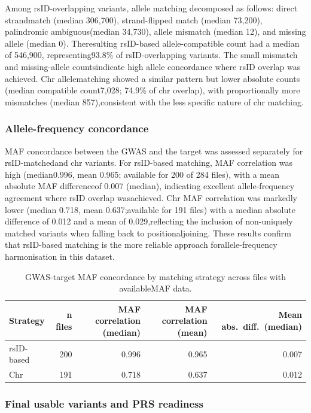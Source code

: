 \documentclass[11pt,a4paper]{article}
\begin{document}
Among rsID-overlapping variants, allele matching decomposed as follows: direct strandmatch (median 306,700), strand-flipped match (median 73,200), palindromic ambiguous(median 34,730), allele mismatch (median 12), and missing allele (median 0). Theresulting rsID-based allele-compatible count had a median of 546,900, representing93.8\% of rsID-overlapping variants. The small mismatch and missing-allele countsindicate high allele concordance where rsID overlap was achieved. Chr allelematching showed a similar pattern but lower absolute counts (median compatible count7,028; 74.9\% of chr overlap), with proportionally more mismatches (median 857),consistent with the less specific nature of chr matching.

\subsubsection*{Allele-frequency concordance}

MAF concordance between the GWAS and the target was assessed separately for rsID-matchedand chr variants. For rsID-based matching, MAF correlation was high (median0.996, mean 0.965; available for 200 of 284 files), with a mean absolute MAF differenceof 0.007 (median), indicating excellent allele-frequency agreement where rsID overlap wasachieved. Chr MAF correlation was markedly lower (median 0.718, mean 0.637;available for 191 files) with a median absolute difference of 0.012 and a mean of 0.029,reflecting the inclusion of non-uniquely matched variants when falling back to positionaljoining. These results confirm that rsID-based matching is the more reliable approach forallele-frequency harmonisation in this dataset.

\begin{table}[h]
\centering
\caption{GWAS-target MAF concordance by matching strategy across files with availableMAF data.}
\label{tab}
\begin{tabular}{lrrrr}
\toprule
Strategy & n files & MAF correlation (median) & MAF correlation (mean) & Mean abs.\ diff.\ (median) \\
\midrule
rsID-based      & 200 & 0.996 & 0.965 & 0.007 \\
Chr   & 191 & 0.718 & 0.637 & 0.012 \\
\bottomrule
\end{tabular}
\end{table}

\subsubsection*{Final usable variants and PRS readiness}
\end{document}
